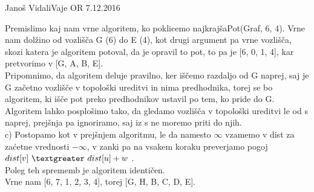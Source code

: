 \begin{naloga}{Janoš Vidali}{Vaje OR 7.12.2016}
\begin{odgovor}
\noindent Premislimo kaj nam vrne algoritem, ko poklicemo najkrajšaPot(Graf, 6, 4).
Vrne nam dolžino od vozlišča G (6) do E (4), kot drugi argument pa vrne vozlišča, 
skozi katera je algoritem potoval, da je opravil to pot, to pa je [6, 0, 1, 4], kar pretvorimo
v [G, A, B, E]. \\

\noindent Pripomnimo, da algoritem deluje pravilno, ker iščemo razdaljo od G naprej, saj je 
G začetno vozlišče v topološki ureditvi in nima predhodnika, torej se bo algoritem, 
ki išče pot preko predhodnikov ustavil po tem, ko pride do G.
Algoritem lahko posplošimo tako, da gledamo vozlišča v topološki ureditvi le od s naprej, 
prejšnja pa ignoriramo, saj iz s ne moremo priti do njih.\\

\noindent c) Postopamo kot v prejšnjem algoritmu, le da namesto $\infty$ vzamemo v dist 
za zaćetne vrednosti $-\infty$, v zanki pa na vsakem koraku preverjamo pogoj  \\
$dist[v] \ \textgreater \ dist[u] + w$ . \\
Poleg teh sprememb je algoritem identičen.\\
Vrne nam [6, 7, 1, 2, 3, 4], torej [G, H, B, C, D, E].

\end{odgovor}
\end{naloga}
